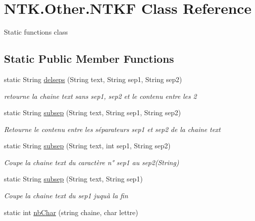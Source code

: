 \hypertarget{class_n_t_k_1_1_other_1_1_n_t_k_f}{}\section{N\+T\+K.\+Other.\+N\+T\+KF Class Reference}
\label{class_n_t_k_1_1_other_1_1_n_t_k_f}


Static functions class  


\subsection*{Static Public Member Functions}
\begin{DoxyCompactItemize}
\item 
static String \mbox{\hyperlink{class_n_t_k_1_1_other_1_1_n_t_k_f_a9bdb50c4747035df875e74e0b25ed3e5}{delseps}} (String text, String sep1, String sep2)
\begin{DoxyCompactList}\small\item\em retourne la chaine text sans sep1, sep2 et le contenu entre les 2 \end{DoxyCompactList}\item 
static String \mbox{\hyperlink{class_n_t_k_1_1_other_1_1_n_t_k_f_a20c6d5f937fe247c5e3c011eba16b97b}{subsep}} (String text, String sep1, String sep2)
\begin{DoxyCompactList}\small\item\em Retourne le contenu entre les séparateurs sep1 et sep2 de la chaine text \end{DoxyCompactList}\item 
static String \mbox{\hyperlink{class_n_t_k_1_1_other_1_1_n_t_k_f_a13958ef3c56ef257b55e3925e710c66d}{subsep}} (String text, int sep1, String sep2)
\begin{DoxyCompactList}\small\item\em Coupe la chaine text du caractère n° sep1 au sep2(\+String) \end{DoxyCompactList}\item 
static String \mbox{\hyperlink{class_n_t_k_1_1_other_1_1_n_t_k_f_a9964a574028ef986df6a31f0d97d9ea7}{subsep}} (String text, String sep1)
\begin{DoxyCompactList}\small\item\em Coupe la chaine text du sep1 juqu\textquotesingle{}à la fin \end{DoxyCompactList}\item 
static int \mbox{\hyperlink{class_n_t_k_1_1_other_1_1_n_t_k_f_a81913a5a3802276bcfe93c7ccac75d50}{nb\+Char}} (string chaine, char lettre)

\end{DoxyCompactItemize}
